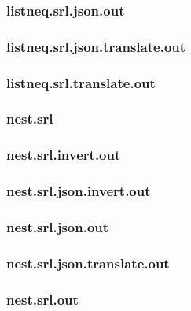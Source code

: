 \subsubsection{listneq.srl.json.out}
\label{app:listneq_srl.json.out}

\subsubsection{listneq.srl.json.translate.out}
\label{app:listneq_srl.json.translate.out}

\subsubsection{listneq.srl.translate.out}
\label{app:listneq_srl.translate.out}

\subsubsection{nest.srl}
\label{app:nest_srl}

\subsubsection{nest.srl.invert.out}
\label{app:nest_srl.invert.out}

\subsubsection{nest.srl.json.invert.out}
\label{app:nest_srl.json.invert.out}

\subsubsection{nest.srl.json.out}
\label{app:nest_srl.json.out}

\subsubsection{nest.srl.json.translate.out}
\label{app:nest_srl.json.translate.out}

\subsubsection{nest.srl.out}
\label{app:nest_srl.out}

